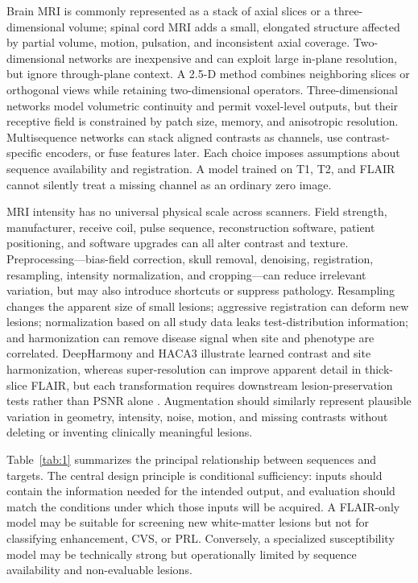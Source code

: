 \documentclass[journal,twoside,web]{ieeecolor}
\begin{document}
Brain MRI is commonly represented as a stack of axial slices or a three-dimensional volume; spinal cord MRI adds a small, elongated structure affected by partial volume, motion, pulsation, and inconsistent axial coverage. Two-dimensional networks are inexpensive and can exploit large in-plane resolution, but ignore through-plane context. A 2.5-D method combines neighboring slices or orthogonal views while retaining two-dimensional operators. Three-dimensional networks model volumetric continuity and permit voxel-level outputs, but their receptive field is constrained by patch size, memory, and anisotropic resolution. Multisequence networks can stack aligned contrasts as channels, use contrast-specific encoders, or fuse features later. Each choice imposes assumptions about sequence availability and registration. A model trained on T1, T2, and FLAIR cannot silently treat a missing channel as an ordinary zero image.


MRI intensity has no universal physical scale across scanners. Field strength, manufacturer, receive coil, pulse sequence, reconstruction software, patient positioning, and software upgrades can all alter contrast and texture. Preprocessing---bias-field correction, skull removal, denoising, registration, resampling, intensity normalization, and cropping---can reduce irrelevant variation, but may also introduce shortcuts or suppress pathology. Resampling changes the apparent size of small lesions; aggressive registration can deform new lesions; normalization based on all study data leaks test-distribution information; and harmonization can remove disease signal when site and phenotype are correlated. DeepHarmony and HACA3 illustrate learned contrast and site harmonization, whereas super-resolution can improve apparent detail in thick-slice FLAIR, but each transformation requires downstream lesion-preservation tests rather than PSNR alone \cite{deepharmony,haca3,giraldo}. Augmentation should similarly represent plausible variation in geometry, intensity, noise, motion, and missing contrasts without deleting or inventing clinically meaningful lesions.


Table~\ref{tab:1} summarizes the principal relationship between sequences and targets. The central design principle is conditional sufficiency: inputs should contain the information needed for the intended output, and evaluation should match the conditions under which those inputs will be acquired. A FLAIR-only model may be suitable for screening new white-matter lesions but not for classifying enhancement, CVS, or PRL. Conversely, a specialized susceptibility model may be technically strong but operationally limited by sequence availability and non-evaluable lesions.
\end{document}
